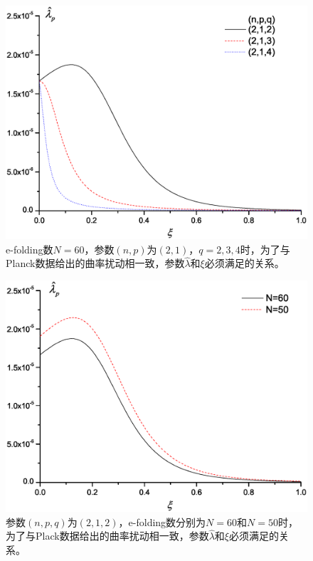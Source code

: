 \begin{figure}\small
  \centering
  \includegraphics[width=5in]{Img/L2,1,q.eps}
  \caption{e-folding数$N=60$，参数$(n,p)$为$(2,
  1)$，$q=2,3,4$时，为了与Planck数据给出的曲率扰动相一致，参数$\hat{\lambda}$和$\xi$必须满足的关系。}\label{fig:L2-1-q}
\end{figure}

\begin{figure}\small
  \centering
  \includegraphics[width=5in]{Img/LN=50.eps}
  \caption{参数$(n,p,q)$为$(2,1,2)$，e-folding数分别为$N=60$和$N=50$时，为了与Plack数据给出的曲率扰动相一致，参数$\hat{\lambda}$和$\xi$必须满足的关系。}\label{fig:LN-50}
\end{figure}

